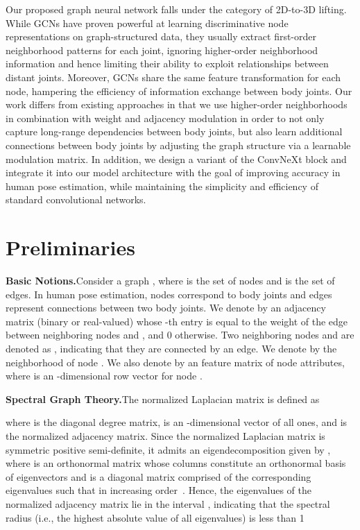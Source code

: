 \documentclass[10pt,journal]{IEEEtran}
\begin{document}
Our proposed graph neural network falls under the category of 2D-to-3D lifting. While GCNs have proven powerful at learning discriminative node representations on graph-structured data, they usually extract first-order neighborhood patterns for each joint, ignoring higher-order neighborhood information and hence limiting their ability to exploit relationships between distant joints. Moreover, GCNs share the same feature transformation for each node, hampering the efficiency of information exchange between body joints. Our work differs from existing approaches in that we use higher-order neighborhoods in combination with weight and adjacency modulation in order to not only capture long-range dependencies between body joints, but also learn additional connections between body joints by adjusting the graph structure via a learnable modulation matrix. In addition, we design a variant of the ConvNeXt block and integrate it into our model architecture with the goal of improving accuracy in human pose estimation, while maintaining the simplicity and efficiency of standard convolutional networks.
	
\section{Preliminaries}
\noindent\textbf{Basic Notions.}\quad Consider a graph , where  is the set of  nodes and  is the set of edges. In human pose estimation, nodes correspond to body joints and edges represent connections between two body joints. We denote by  an  adjacency matrix (binary or real-valued) whose -th entry  is equal to the weight of the edge between neighboring nodes  and , and 0 otherwise. Two neighboring nodes  and  are denoted as , indicating that they are connected by an edge. We denote by  the neighborhood of node . We also denote by  an  feature matrix of node attributes, where  is an -dimensional row vector for node .
	
\medskip\noindent\textbf{Spectral Graph Theory.}\quad The normalized Laplacian matrix is defined as

where  is the diagonal degree matrix,  is an -dimensional vector of all ones, and  is the normalized adjacency matrix. Since the normalized Laplacian matrix is symmetric positive semi-definite, it admits an eigendecomposition given by , where  is an orthonormal matrix whose columns constitute an orthonormal basis of eigenvectors and  is a diagonal matrix comprised of the corresponding eigenvalues such that  in increasing order~\cite{Chung:97}. Hence, the eigenvalues of the normalized adjacency matrix lie in the interval , indicating that the spectral radius (i.e., the highest absolute value of all eigenvalues)  is less than 1
\end{document}
